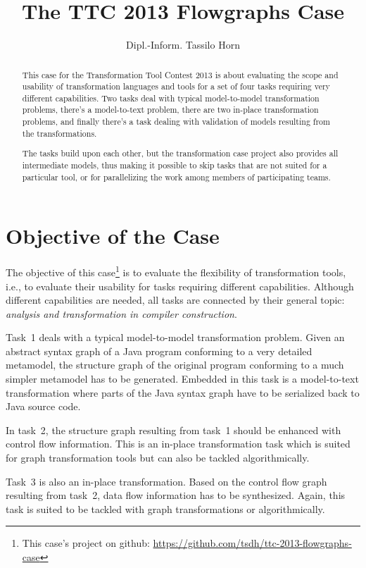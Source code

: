 \documentclass[submission]{eptcs}
\title{The TTC 2013 Flowgraphs Case}
\author{Dipl.-Inform. Tassilo Horn
  \email{\myemail}
  \institute{University Koblenz-Landau, Institute for Software Technology, Germany}}
\begin{document}
\maketitle

\begin{abstract}
  This case for the Transformation Tool Contest 2013 is about evaluating the
  scope and usability of transformation languages and tools for a set of four
  tasks requiring very different capabilities.  Two tasks deal with typical
  model-to-model transformation problems, there's a model-to-text problem,
  there are two in-place transformation problems, and finally there's a task
  dealing with validation of models resulting from the transformations.

  The tasks build upon each other, but the transformation case project also
  provides all intermediate models, thus making it possible to skip tasks that
  are not suited for a particular tool, or for parallelizing the work among
  members of participating teams.
\end{abstract}


\section{Objective of the Case}
\label{sec:objective}

The objective of this case\footnote{This case's project on github:
  \url{https://github.com/tsdh/ttc-2013-flowgraphs-case}} is to evaluate the
flexibility of transformation tools, i.e., to evaluate their usability for
tasks requiring different capabilities.  Although different capabilities are
needed, all tasks are connected by their general topic: \emph{analysis and
  transformation in compiler construction}.

Task~1 deals with a typical model-to-model transformation problem.  Given an
abstract syntax graph of a Java program conforming to a very detailed
metamodel, the structure graph of the original program conforming to a much
simpler metamodel has to be generated.  Embedded in this task is a
model-to-text transformation where parts of the Java syntax graph have to be
serialized back to Java source code.

In task~2, the structure graph resulting from task~1 should be enhanced with
control flow information.  This is an in-place transformation task which is
suited for graph transformation tools but can also be tackled algorithmically.

Task~3 is also an in-place transformation.  Based on the control flow graph
resulting from task~2, data flow information has to be synthesized.  Again,
this task is suited to be tackled with graph transformations or
algorithmically.
\end{document}
